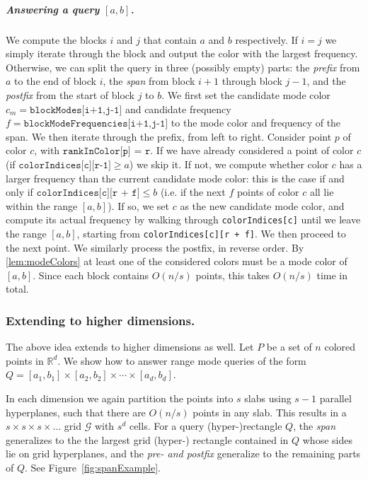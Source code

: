 \documentclass[twoside,leqno,twocolumn]{article}
\newcommand{\R} {\mathbb{R}\xspace}
\newcommand{\G} {\ensuremath{\mathcal{G}}\xspace}
\begin{document}
\subparagraph{Answering a query $[a,b]$.} We compute the blocks $i$ and
$j$ that contain $a$ and $b$ respectively. If $i = j$ we simply
iterate through the block and output the color with the largest
frequency. Otherwise, we can split the query in three (possibly empty)
parts: the \emph{prefix} from $a$ to the end of block $i$, the \emph{span} from
block $i+1$ through block $j-1$, and the \emph{postfix} from the start of
block $j$ to $b$. We first set the candidate mode color $c_m = \texttt{blockModes[i+1,j-1]}$ and
candidate frequency $f = \texttt{blockModeFrequencies[i+1,j-1]}$ to the
mode color and frequency of the span.
We then iterate through the prefix, from
left to right. Consider point $p$ of color $c$, with
$\texttt{rankInColor[p] = r}$. If we have already considered a point of
color $c$ (if $\texttt{colorIndices[c][r-1]} \geq a$) we skip
it. If not, we compute whether color $c$ has a larger frequency than the current
candidate mode color: this is the case if and only if $\texttt{colorIndices[c][r +
  f]} \leq b$ (i.e. if the next $f$ points of color $c$ all lie within
the range $[a,b]$). If so, we set $c$ as the new candidate mode
color, and compute its actual frequency by walking through
\texttt{colorIndices[c]} until we leave the range $[a,b]$, starting from \texttt{colorIndices[c][r + f]}.
We then proceed to the next point. We
similarly process the postfix, in reverse order. By \cref{lem:modeColors} at least one
of the considered colors must be a mode color of $[a,b]$. Since each
block contains $O(n/s)$ points, this takes $O(n/s)$ time in total.


\subsubsection{Extending to higher dimensions.} The above idea extends
to higher dimensions as well. Let $P$ be a set of $n$ colored points
in $\R^d$. We show how to answer range mode queries of the form
$Q=[a_1,b_1] \times [a_2,b_2] \times \cdots \times [a_d,b_d]$.

In each dimension we again partition the points into $s$ slabs using
$s-1$ parallel hyperplanes, such that there are $O(n/s)$ points in any
slab. This results in a $s \times s \times s \times \dots$ grid \G
with $s^d$ cells. For a query (hyper-)rectangle $Q$, the \emph{span}
generalizes to the the largest grid (hyper-) rectangle contained in
$Q$ whose sides lie on grid hyperplanes, and the \emph{pre- and
  postfix} generalize to the remaining parts of $Q$. See
Figure~\ref{fig:spanExample}.
\end{document}
